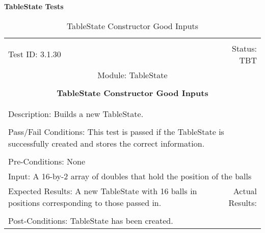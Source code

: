 \documentclass[titlepage]{article}
\begin{document}
\large{\textbf{TableState Tests}}
\begin{center}%
\begin{table}[h!]
\begin{tabular}{|l r|}\hline&\\[-2mm]
	Test ID: 3.1.30	&Status: TBT\\[-3mm]
	\multicolumn{2}{|c|}{Module: TableState}\\&\\
	\multicolumn{2}{|c|}{\textbf{\large{TableState Constructor Good Inputs}}}\\&\\\hline&\\[-3mm]
	\multicolumn{2}{|p{\textwidth}|}{Description: Builds a new TableState.}\\[1mm]\hline&\\[-3mm]
	\multicolumn{2}{|p{\textwidth}|}{Pass/Fail Conditions: This test is passed if the TableState is successfully created and stores the correct information.}\\[1mm]\hline&\\[-3mm]
	\multicolumn{2}{|p{\textwidth}|}{Pre-Conditions: None}\\[4mm]
	\multicolumn{2}{|p{\textwidth}|}{Input: A 16-by-2 array of doubles that hold the position of the balls}\\[2mm]\hline
	\multicolumn{1}{|p{0.49\textwidth}}{Expected Results: A new TableState with 16 balls in positions corresponding to those passed in.}	&\multicolumn{1}{|p{0.45\textwidth}|}{Actual Results: }\\\hline&\\[-3mm]
	\multicolumn{2}{|p{\textwidth}|}{Post-Conditions: TableState has been created.}\\\hline
\end{tabular}
\caption{TableState Constructor Good Inputs}
\end{table}
\end{center}
\end{document}

